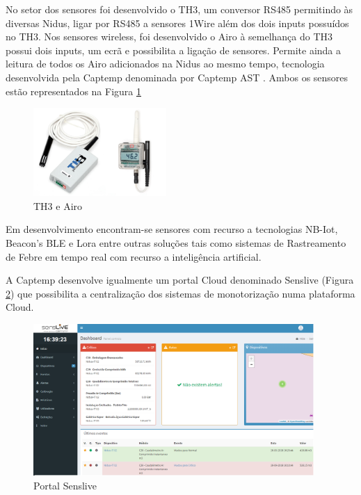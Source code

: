 No setor dos sensores foi desenvolvido o TH3, um conversor RS485 permitindo às diversas Nidus, ligar por RS485 a sensores 1Wire além dos dois inputs possuídos no TH3. Nos sensores wireless, foi desenvolvido o Airo à semelhança do TH3 possui dois inputs, um ecrã e possibilita a ligação de sensores. Permite ainda a leitura de todos os Airo adicionados na Nidus ao mesmo tempo, tecnologia desenvolvida pela Captemp denominada por Captemp AST \cite{Captemp_AST}. Ambos os sensores estão representados na Figura \ref{figairoth3} 
\begin{figure}[ht]
  \centering
  \includegraphics[width=0.45\textwidth]{images/th3airo.png}
  \caption{ TH3 e Airo}\label{figairoth3}
\end{figure}
\par
Em desenvolvimento encontram-se sensores com recurso a tecnologias NB-Iot, Beacon's BLE e Lora entre outras soluções tais como sistemas de Rastreamento de Febre em tempo real com recurso a inteligência artificial.
\par
A Captemp desenvolve igualmente um portal Cloud denominado Senslive (Figura \ref{figsenslive}) que possibilita a centralização dos sistemas de monotorização numa plataforma Cloud.

\begin{figure}[ht]
  \centering
  \includegraphics[width=0.95\textwidth]{images/mwsnap0791.png}
  \caption{ Portal Senslive}\label{figsenslive}
\end{figure}




